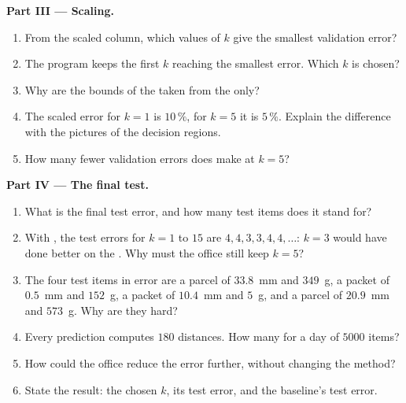 \begin{problem}
\medskip\noindent\textbf{Part III --- Scaling.}
\begin{enumerate}[resume]
  \item From the scaled column, which values of $k$ give the smallest validation error?
  \item The program keeps the first $k$ reaching the smallest error. Which $k$ is chosen?
  \item Why are the bounds of the  taken from the  only?
  \item The scaled error for $k = 1$ is $10\,\%$, for $k = 5$ it is $5\,\%$. Explain the difference with the pictures
    of the decision regions.
  \item How many fewer validation errors does  make at $k = 5$?
\end{enumerate}

\medskip\noindent\textbf{Part IV --- The final test.}
\begin{enumerate}[resume]
  \item What is the final test error, and how many test items does it stand for?
  \item With , the test errors for $k = 1$ to $15$ are $4, 4, 3, 3, 4, 4, \dots$: $k = 3$ would have done better
    on the . Why must the office still keep $k = 5$?
  \item The four test items in error are a parcel of $33.8$~mm and $349$~g, a packet of $0.5$~mm and $152$~g, a
    packet of $10.4$~mm and $5$~g, and a parcel of $20.9$~mm and $573$~g. Why are they hard?
  \item Every prediction computes $180$ distances. How many for a day of $5000$ items?
  \item How could the office reduce the error further, without changing the method?
  \item State the result: the chosen $k$, its test error, and the baseline's test error.
\end{enumerate}
\end{problem}
